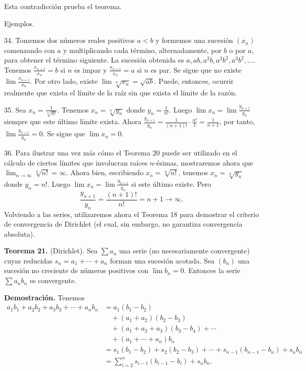 \documentclass[12pt,oneside]{book}
\begin{document}
Esta contradicción prueba el teorema.

Ejemplos.

34. Tomemos dos números reales positivos \(a < b\) y formemos una sucesión \((x_n)\) comenzando con \(a\) y multiplicando cada término, alternadamente, por \(b\) o por \(a\), para obtener el término siguiente. La sucesión obtenida es \(a, ab, a^2b, a^2b^2, a^3b^2, \ldots\). Tenemos \(\frac{x_{n+1}}{x_n} = b\) si \(n\) es impar y \(\frac{x_{n+1}}{x_n} = a\) si \(n\) es par. Se sigue que no existe \(\lim\frac{x_{n+1}}{x_n}\). Por otro lado, existe \(\lim\sqrt[n]{x_n} = \sqrt{ab}\). Puede, entonces, ocurrir realmente que exista el límite de la raíz sin que exista el límite de la razón.

35. Sea \(x_n = \frac{1}{\sqrt[n]{n!}}\). Tenemos \(x_n = \sqrt[n]{y_n}\) donde \(y_n = \frac{1}{n!}\). Luego \(\lim x_n = \lim\frac{y_{n+1}}{y_n}\) siempre que este último límite exista. Ahora \(\frac{y_{n+1}}{y_n} = \frac{1}{(n+1)!} \cdot \frac{n!}{1} = \frac{1}{n+1}\), por tanto, \(\lim\frac{y_{n+1}}{y_n} = 0\). Se sigue que \(\lim x_n = 0\).

36. Para ilustrar una vez más cómo el Teorema 20 puede ser utilizado en el cálculo de ciertos límites que involucran raíces \(n\)-ésimas, mostraremos ahora que \(\lim_{n \to \infty} \sqrt[n]{n!} = \infty\). Ahora bien, escribiendo \(x_n = \sqrt[n]{n!}\), tenemos \(x_n = \sqrt[n]{y_n}\) donde \(y_n = n!\). Luego \(\lim x_n = \lim \frac{y_{n+1}}{y_n}\) si este último existe. Pero
\[
\frac{y_{n+1}}{y_n} = \frac{(n+1)!}{n!} = n+1 \to \infty.
\]
Volviendo a las series, utilizaremos ahora el Teorema 18 para demostrar el criterio de convergencia de Dirichlet (el cual, sin embargo, no garantiza convergencia absoluta).

\textbf{Teorema 21.} (Dirichlet). Sea \(\sum a_n\) una serie (no necesariamente convergente) cuyas reducidas \(s_n = a_1 + \cdots + a_n\) forman una sucesión acotada. Sea \((b_n)\) una sucesión no creciente de números positivos con \(\lim b_n = 0\). Entonces la serie \(\sum a_n b_n\) es convergente.

\textbf{Demostración.} Tenemos
\[
\begin{aligned}
a_1 b_1 + a_2 b_2 + a_3 b_3 + \cdots + a_n b_n &= a_1(b_1 - b_2) \\
&\quad + (a_1 + a_2)(b_2 - b_3) \\
&\quad + (a_1 + a_2 + a_3)(b_3 - b_4) + \cdots \\
&\quad + (a_1 + \cdots + a_n) b_n \\
&= s_1(b_1 - b_2) + s_2(b_2 - b_3) + \cdots + s_{n-1}(b_{n-1} - b_n) + s_n b_n \\
&= \sum_{i=2}^{n} s_{i-1}(b_{i-1} - b_i) + s_n b_n.
\end{aligned}
\]
\end{document}
